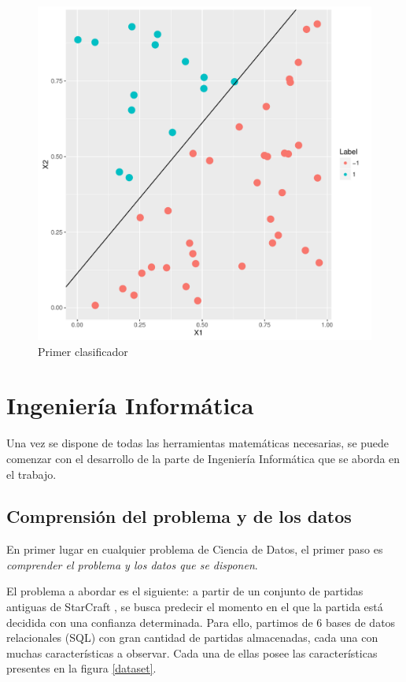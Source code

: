 \documentclass[a4paper,11pt]{book}\usepackage[]{graphicx}\usepackage[]{color}
\makeatletter
\def\maxwidth{ %
  \ifdim\Gin@nat@width>\linewidth
    \linewidth
  \else
    \Gin@nat@width
  \fi
}
\newenvironment{knitrout}{}{} %
\makeatother
\begin{document}
\begin{knitrout}
\color{fgcolor}\begin{figure}
\includegraphics[width=\maxwidth]{figure/classificationExample-1} \caption[Primer clasificador]{Primer clasificador}\label{fig:classificationExample}
\end{figure}


\end{knitrout}

\newpage
\section{Ingeniería Informática}
Una vez se dispone de todas las herramientas matemáticas necesarias,
se puede comenzar con el desarrollo de la parte de Ingeniería Informática que
se aborda en el trabajo.

\subsection{Comprensión del problema y de los datos}

En primer lugar en cualquier problema de Ciencia de Datos, el primer
paso es \emph{comprender el problema y los datos que se disponen}.

El problema a abordar es el siguiente: a partir de un conjunto de
partidas antiguas de StarCraft \cite{dataset2014}, se busca predecir
el momento en el que la partida está decidida con una confianza
determinada. Para ello, partimos de 6 bases de datos relacionales
(SQL) con gran cantidad de partidas almacenadas, cada una con muchas
características a observar. Cada una de ellas posee las
características presentes en la figura \ref{dataset}.
\end{document}
